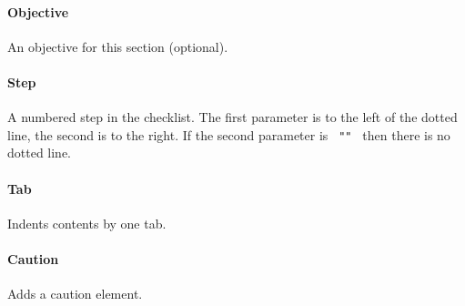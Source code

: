 \paragraph{Objective}\label{objective}

An objective for this section (optional).

\begin{Shaded}
\begin{Highlighting}[]
\end{Highlighting}
\end{Shaded}

\paragraph{Step}\label{step}

A numbered step in the checklist. The first parameter is to the left of
the dotted line, the second is to the right. If the second parameter is
\texttt{\ ""\ } then there is no dotted line.

\begin{Shaded}
\begin{Highlighting}[]
\end{Highlighting}
\end{Shaded}

\paragraph{Tab}\label{tab}

Indents contents by one tab.

\begin{Shaded}
\begin{Highlighting}[]
\end{Highlighting}
\end{Shaded}

\paragraph{Caution}\label{caution}

Adds a caution element.

\begin{Shaded}
\begin{Highlighting}[]
\end{Highlighting}
\end{Shaded}

